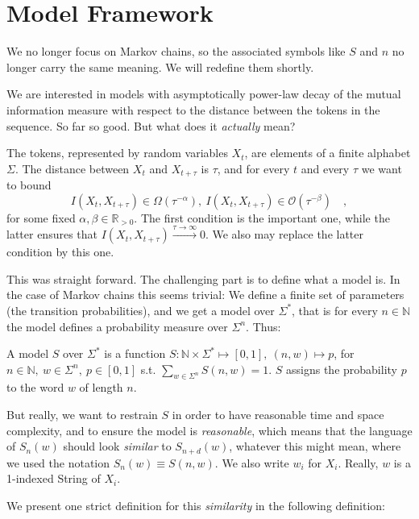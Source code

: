\documentclass[../../main.tex]{subfiles}
\begin{document}
\section{Model Framework}
    We no longer focus on Markov chains, so the associated symbols like $S$ and $n$ no longer carry the same meaning. We will redefine them shortly.

    We are interested in models with asymptotically power-law decay of the mutual information measure with respect to the distance between the tokens in the sequence. So far so good. But what does it \emph{actually} mean?

    The tokens, represented by random variables $X_t$, are elements of a finite alphabet $\Sigma$. The distance between $X_t$ and $X_{t + \tau}$ is $\tau$, and for every $t$ and every $\tau$ we want to bound
    \[
        I(X_t, X_{t + \tau}) \in \Omega(\tau^{-\alpha}), \ I(X_t, X_{t + \tau}) \in \mathcal{O}(\tau^{-\beta}) \quad ,
    \]
    for some fixed $\alpha, \beta \in \mathbb{R}_{>0}$. The first condition is the important one, while the latter ensures that $I(X_t, X_{t + \tau}) \xrightarrow{\tau \to \infty} 0$. We also may replace the latter condition by this one.

    This was straight forward. The challenging part is to define what a  model is. In the case of Markov chains this seems trivial: We define a finite set of parameters (the transition probabilities), and we get a model over $\Sigma^*$, that is for every $n \in \mathbb{N}$ the model defines a probability measure over $\Sigma^n$. Thus:

    \begin{definition}
        A model $S$ over $\Sigma^*$ is a function $S: \mathbb{N} \times \Sigma^* \mapsto [0, 1], \ (n, w) \mapsto p$, for $n \in \mathbb{N}, \ w \in \Sigma^n, \ p \in [0, 1]$ s.t. $\sum_{w \in \Sigma^n} S(n, w) = 1$. $S$ assigns the probability $p$ to the word $w$ of length $n$.
    \end{definition}

    But really, we want to restrain $S$ in order to have reasonable time and space complexity, and to ensure the model is \emph{reasonable}, which means that the language of $S_n(w)$ should look \emph{similar} to $S_{n + d}(w)$, whatever this might mean, where we used the notation $S_n(w) \equiv S(n, w)$. We also write $w_i$ for $X_i$. Really, $w$ is a 1-indexed String of $X_i$.  

    We present one strict definition for this \emph{similarity} in the following definition:
\end{document}
